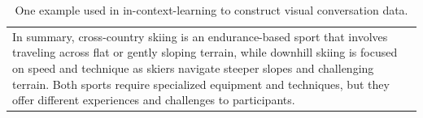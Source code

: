 \begin{table}[h!]
\begin{minipage}{0.99\columnwidth}
\begin{tcolorbox}
\begin{tabular}{p{}}
\\
In summary, cross-country skiing is an endurance-based sport that involves traveling across flat or gently sloping terrain, while downhill skiing is focused on speed and technique as skiers navigate steeper slopes and challenging terrain. Both sports require specialized equipment and techniques, but they offer different experiences and challenges to participants.
    \end{tabular}
\end{tcolorbox}
\vspace{-2mm}
\caption{One example used in in-context-learning to construct visual conversation data.}
    \label{tab:example2_cap_conv}
\end{minipage}
\end{table}
